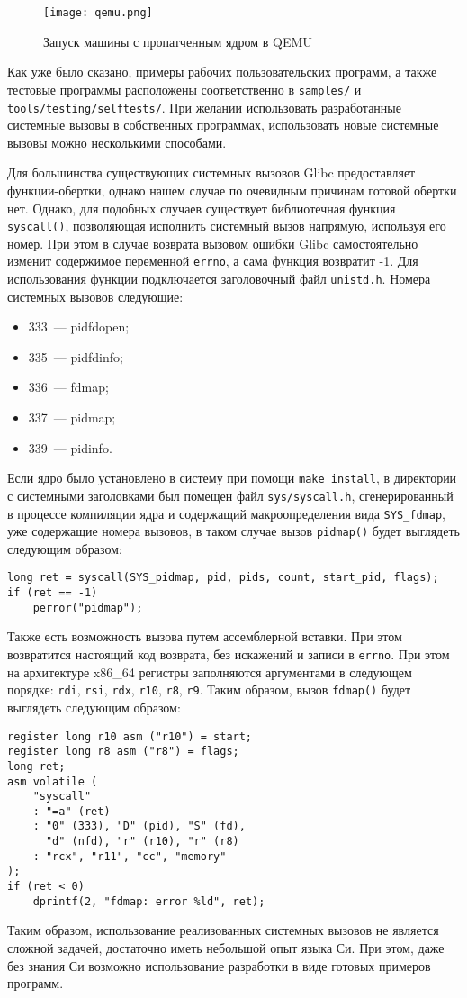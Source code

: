 \begin{figure}
  \centering
  \texttt{[image: qemu.png]}
  \caption{Запуск машины с пропатченным ядром в QEMU}
  \label{fig:qemu}
\end{figure}

Как уже было сказано, примеры рабочих пользовательских программ, а также
тестовые программы расположены соответственно в \texttt{samples/} и
\texttt{tools/testing/selftests/}. При желании использовать разработанные
системные вызовы в собственных программах, использовать новые системные вызовы
можно несколькими способами.

Для большинства существующих системных вызовов Glibc предоставляет
функции-обертки, однако нашем случае по очевидным причинам готовой обертки нет.
Однако, для подобных случаев существует библиотечная функция \texttt{syscall()},
позволяющая исполнить системный вызов напрямую, используя его номер. При этом в
случае возврата вызовом ошибки Glibc самостоятельно изменит содержимое
переменной \texttt{errno}, а сама функция возвратит -1. Для использования
функции подключается заголовочный файл \texttt{unistd.h}. Номера системных
вызовов следующие:
\begin{itemize}
\item 333~--- pidfdopen;
\item 335~--- pidfdinfo;
\item 336~--- fdmap;
\item 337~--- pidmap;
\item 339~--- pidinfo.
\end{itemize}

Если ядро было установлено в систему при помощи \texttt{make install}, в
директории с системными заголовками был помещен файл \texttt{sys/syscall.h},
сгенерированный в процессе компиляции ядра и содержащий макроопределения вида
\texttt{SYS\_fdmap}, уже содержащие номера вызовов, в таком случае вызов
\texttt{pidmap()} будет выглядеть следующим образом:
\medskip
\begin{lstlisting}[style=cstyle]
long ret = syscall(SYS_pidmap, pid, pids, count, start_pid, flags);
if (ret == -1)
	perror("pidmap");
\end{lstlisting}
\medskip

Также есть возможность вызова путем ассемблерной вставки. При этом возвратится
настоящий код возврата, без искажений и записи в \texttt{errno}. При этом на
архитектуре x86\_64 регистры заполняются аргументами в следующем порядке:
\texttt{rdi}, \texttt{rsi}, \texttt{rdx}, \texttt{r10}, \texttt{r8},
\texttt{r9}. Таким образом, вызов \texttt{fdmap()} будет выглядеть следующим
образом:
\medskip
\begin{lstlisting}[style=cstyle]
register long r10 asm ("r10") = start;
register long r8 asm ("r8") = flags;
long ret;
asm volatile (
	"syscall"
	: "=a" (ret)
	: "0" (333), "D" (pid), "S" (fd),
	  "d" (nfd), "r" (r10), "r" (r8)
	: "rcx", "r11", "cc", "memory"
);
if (ret < 0)
	dprintf(2, "fdmap: error %ld", ret);
\end{lstlisting}
\medskip

Таким образом, использование реализованных системных вызовов не является сложной
задачей, достаточно иметь небольшой опыт языка Си. При этом, даже без знания Си
возможно использование разработки в виде готовых примеров программ.

